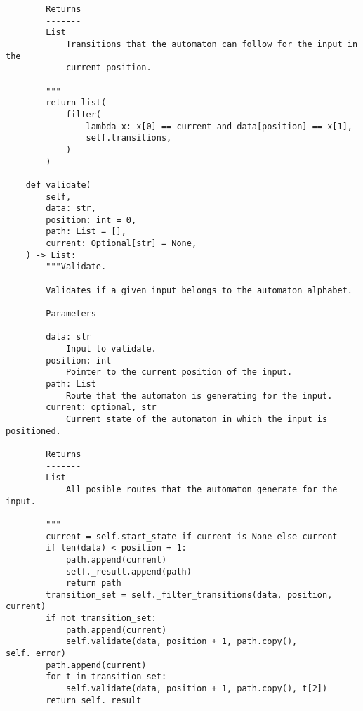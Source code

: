 \begin{lstlisting}
        Returns
        -------
        List
            Transitions that the automaton can follow for the input in the
            current position.

        """
        return list(
            filter(
                lambda x: x[0] == current and data[position] == x[1],
                self.transitions,
            )
        )

    def validate(
        self,
        data: str,
        position: int = 0,
        path: List = [],
        current: Optional[str] = None,
    ) -> List:
        """Validate.

        Validates if a given input belongs to the automaton alphabet.

        Parameters
        ----------
        data: str
            Input to validate.
        position: int
            Pointer to the current position of the input.
        path: List
            Route that the automaton is generating for the input.
        current: optional, str
            Current state of the automaton in which the input is positioned.

        Returns
        -------
        List
            All posible routes that the automaton generate for the input.

        """
        current = self.start_state if current is None else current
        if len(data) < position + 1:
            path.append(current)
            self._result.append(path)
            return path
        transition_set = self._filter_transitions(data, position, current)
        if not transition_set:
            path.append(current)
            self.validate(data, position + 1, path.copy(), self._error)
        path.append(current)
        for t in transition_set:
            self.validate(data, position + 1, path.copy(), t[2])
        return self._result
\end{lstlisting}
